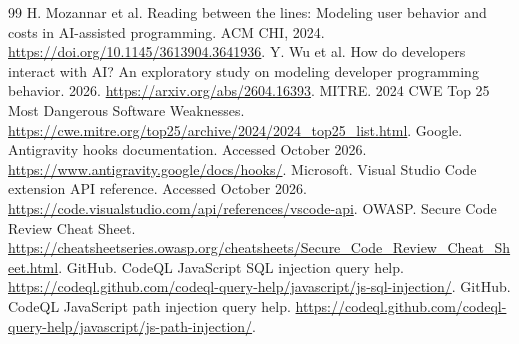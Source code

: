 \documentclass[12pt,a4paper]{article}
\begin{document}
\begin{thebibliography}{99}
 H. Mozannar et al. Reading between the lines: Modeling user behavior and costs in AI-assisted programming. ACM CHI, 2024. \url{https://doi.org/10.1145/3613904.3641936}.
 Y. Wu et al. How do developers interact with AI? An exploratory study on modeling developer programming behavior. 2026. \url{https://arxiv.org/abs/2604.16393}.
 MITRE. 2024 CWE Top 25 Most Dangerous Software Weaknesses. \url{https://cwe.mitre.org/top25/archive/2024/2024_top25_list.html}.
 Google. Antigravity hooks documentation. Accessed October 2026. \url{https://www.antigravity.google/docs/hooks/}.
 Microsoft. Visual Studio Code extension API reference. Accessed October 2026. \url{https://code.visualstudio.com/api/references/vscode-api}.
 OWASP. Secure Code Review Cheat Sheet. \url{https://cheatsheetseries.owasp.org/cheatsheets/Secure_Code_Review_Cheat_Sheet.html}.
 GitHub. CodeQL JavaScript SQL injection query help. \url{https://codeql.github.com/codeql-query-help/javascript/js-sql-injection/}.
 GitHub. CodeQL JavaScript path injection query help. \url{https://codeql.github.com/codeql-query-help/javascript/js-path-injection/}.
\end{thebibliography}
\endgroup
\end{document}

